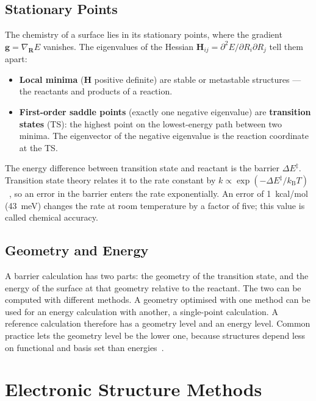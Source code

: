 \subsection{Stationary Points}
\label{sec:background-stationary}

The chemistry of a surface lies in its stationary points, where the gradient
$\mathbf{g} = \nabla_\mathbf{R} E$ vanishes. The eigenvalues of the Hessian
$\mathbf{H}_{ij} = \partial^2 E / \partial R_i \partial R_j$ tell them apart:

\begin{itemize}
  \item \textbf{Local minima} ($\mathbf{H}$ positive definite) are stable or
    metastable structures --- the reactants and products of a reaction.
  \item \textbf{First-order saddle points} (exactly one negative eigenvalue)
    are \textbf{transition states} (TS): the highest point on the
    lowest-energy path between two minima. The eigenvector of the negative
    eigenvalue is the reaction coordinate at the TS.
\end{itemize}

The energy difference between transition state and reactant is the barrier
$\Delta E^\ddagger$. Transition state theory relates it to the rate constant
by $k \propto \exp(-\Delta E^\ddagger / k_\text{B} T)$~\cite{eyring1935}, so
an error in the barrier enters the rate exponentially. An error of
1~kcal/mol (43~meV) changes the rate at room temperature by a factor of
five; this value is called chemical accuracy.

\subsection{Geometry and Energy}
\label{sec:geom-energy}

A barrier calculation has two parts: the geometry of the transition state,
and the energy of the surface at that geometry relative to the reactant. The
two can be computed with different methods. A geometry optimised with one
method can be used for an energy calculation with another, a single-point
calculation. A reference calculation therefore has a geometry level and an
energy level. Common practice lets the geometry level be the lower one,
because structures depend less on functional and basis set than
energies~\cite{bursch2022}.

\section{Electronic Structure Methods}
\label{sec:background-electronic}


